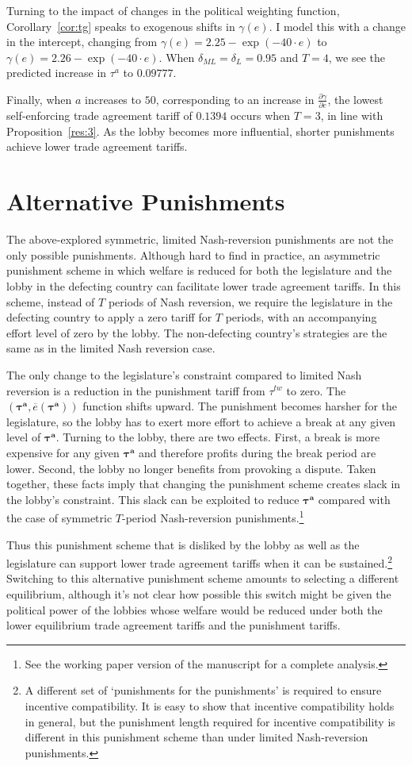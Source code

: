 \documentclass[authoryear, review]{elsarticle}
\newcommand{\ov}{\overline}
\newcommand{\bta}{\bm{\tau^a}}
\newcommand{\ga}{\gamma}
\newcommand{\de}{\delta}
\begin{document}
Turning to the impact of changes in the political weighting function, Corollary~\ref{cor:tg} speaks to exogenous shifts in $\ga(e)$. I model this with a change in the intercept, changing from $\ga(e) = 2.25 - \exp(-40\cdot e)$ to $\ga(e) = 2.26 - \exp(-40\cdot e)$. When $\de_{ML} = \de_L = 0.95$ and $T=4$, we see the predicted increase in $\tau^a$ to $0.09777$.

Finally, when $a$ increases to $50$, corresponding to an increase in $\frac{\partial \ga}{\partial e}$, the lowest self-enforcing trade agreement tariff of $0.1394$ occurs when $T=3$, in line with Proposition~\ref{res:3}. As the lobby becomes more influential, shorter punishments achieve lower trade agreement tariffs.


\section{Alternative Punishments}
\label{sec:asymmetric}
The above-explored symmetric, limited Nash-reversion punishments are not the only possible punishments. Although hard to find in practice, an asymmetric punishment scheme in which welfare is reduced for both the legislature and the lobby in the defecting country can facilitate lower trade agreement tariffs. In this scheme, instead of $T$ periods of Nash reversion, we require the legislature in the defecting country to apply a zero tariff for $T$ periods, with an accompanying effort level of zero by the lobby. The non-defecting country's strategies are the same as in the limited Nash reversion case.

The only change to the legislature's constraint compared to limited Nash reversion is a reduction in the punishment tariff from $\tau^{tw}$ to zero. The $\left(\bta,\ov{e}\left(\bta\right) \right)$ function shifts upward. The punishment becomes harsher for the legislature, so the lobby has to exert more effort to achieve a break at any given level of $\bta$. Turning to the lobby, there are two effects. First, a break is more expensive for any given $\bta$ and therefore profits during the break period are lower. Second, the lobby no longer benefits from provoking a dispute. Taken together, these facts imply that changing the punishment scheme creates slack in the lobby's constraint. This slack can be exploited to reduce $\bta$ compared with the case of symmetric $T$-period Nash-reversion punishments.\footnote{See the working paper version of the manuscript for a complete analysis.}

Thus this punishment scheme that is disliked by the lobby as well as the legislature can support lower trade agreement tariffs when it can be sustained.\footnote{A different set of `punishments for the punishments' is required to ensure incentive compatibility. It is easy to show that incentive compatibility holds in general, but the punishment length required for incentive compatibility is different in this punishment scheme than under limited Nash-reversion punishments.} Switching to this alternative punishment scheme amounts to selecting a different equilibrium, although it's not clear how possible this switch might be given the political power of the lobbies whose welfare would be reduced under both the lower equilibrium trade agreement tariffs and the punishment tariffs.
\end{document}
